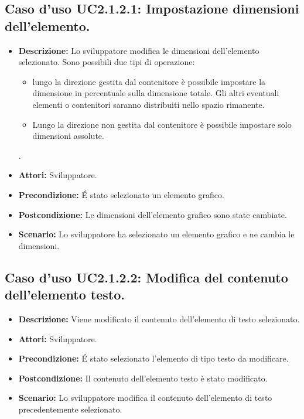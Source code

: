 \subsection{Caso d'uso UC2.1.2.1: Impostazione dimensioni dell'elemento.}
\begin{itemize}
\item[]\textbf{Descrizione:} Lo sviluppatore modifica le dimensioni dell'elemento selezionato. Sono possibili due tipi di operazione:

\begin{itemize}

\item lungo la direzione gestita dal contenitore è possibile impostare la dimensione in percentuale sulla dimensione totale. Gli altri eventuali elementi o contenitori saranno distribuiti nello spazio rimanente.


\item Lungo la direzione non gestita dal contenitore è possibile impostare solo dimensioni assolute.


\end{itemize}.
\item[]\textbf{Attori:} Sviluppatore. 
\item[]\textbf{Precondizione:} \'E stato selezionato un elemento grafico. 
\item[]\textbf{Postcondizione:} Le dimensioni dell'elemento grafico  sono state cambiate. 
\item[]\textbf{Scenario:}
Lo sviluppatore ha selezionato un elemento grafico e ne cambia le dimensioni. 
\end{itemize}

\subsection{Caso d'uso UC2.1.2.2: Modifica del contenuto dell'elemento testo.}
\begin{itemize}
\item[]\textbf{Descrizione:} Viene modificato il contenuto dell'elemento di testo selezionato.
\item[]\textbf{Attori:} Sviluppatore. 
\item[]\textbf{Precondizione:} \'E stato selezionato l'elemento di tipo testo da modificare. 
\item[]\textbf{Postcondizione:} Il contenuto dell'elemento testo è stato modificato. 
\item[]\textbf{Scenario:}
Lo sviluppatore modifica il contenuto dell'elemento di testo precedentemente selezionato. 
\end{itemize}

